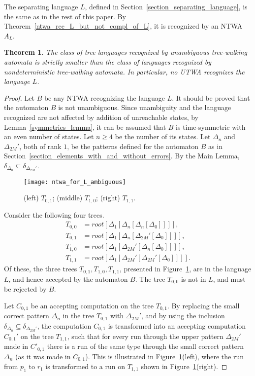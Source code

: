 \documentclass[12pt,a4paper]{article}
\newtheorem{theorem}{Theorem}
\theoremstyle{definition}
\begin{document}
The separating language $L$, defined in Section~\ref{section_separating_language},
is the same as in the rest of this paper.
By Theorem~\ref{ntwa_rec_L_but_not_compl_of_L},
it is recognized by an NTWA $A_L$.

\begin{theorem}\label{theorem_utwa_strictly_weaker_than_ntwa}
The class of tree languages recognized by unambiguous tree-walking automata
is strictly smaller than the class of languages recognized by nondeterministic tree-walking automata.
In particular, no UTWA recognizes the language $L$.
\end{theorem}
\begin{proof}
Let $B$ be any NTWA recognizing the language $L$.
It should be proved that the automaton $B$ is not unambiguous.
Since unambiguity and the language recognized
are not affected by addition of unreachable states,
by Lemma~\ref{symmetries_lemma},
it can be assumed that $B$ is time-symmetric with an even number of states.
Let $n \geqslant 4$ be the number of its states.
Let $\Delta_n$ and $\Delta_{2M}'$, both of rank $1$,
be the patterns defined for the automaton $B$
as in Section~\ref{section_elements_with_and_without_errors}.
By the Main Lemma, $\delta_{\Delta_n} \subseteq \delta_{\Delta_{2M}'}$.

\begin{figure}[tp]
	\centerline{\texttt{[image: ntwa\_for\_L\_ambiguous]}}
	\caption{(left) $T_{0,1}$; (middle) $T_{1,0}$; (right) $T_{1,1}$.}
	\label{f:ntwa_for_L_ambiguous}
\end{figure}

Consider the following four trees.
\begin{align*} 
T_{0,0} &= \mathit{root}[\Delta_1[\Delta_n[\Delta_n[\Delta_0]]]],\\
T_{0,1} &= \mathit{root}[\Delta_1[\Delta_n[\Delta_{2M}'[\Delta_0]]]],\\
T_{1,0} &= \mathit{root}[\Delta_1[\Delta_{2M}'[\Delta_n[\Delta_0]]]],\\
T_{1,1} &= \mathit{root}[\Delta_1[\Delta_{2M}'[\Delta_{2M}'[\Delta_0]]]].
\end{align*}
Of these, the three trees $T_{0,1}, T_{1,0}, T_{1,1}$,
presented in Figure~\ref{f:ntwa_for_L_ambiguous},
are in the language $L$, and hence accepted by the automaton $B$.
The tree $T_{0,0}$ is not in $L$, and must be rejected by $B$.

Let $C_{0,1}$ be an accepting computation on the tree $T_{0,1}$.
By replacing the small correct pattern $\Delta_n$ in the tree $T_{0,1}$
with $\Delta_{2M}'$, and by using the inclusion $\delta_{\Delta_n} \subseteq \delta_{\Delta_{2M}'}$,
the computation $C_{0,1}$ is transformed into an accepting computation $C_{0,1}'$ 
on the tree $T_{1,1}$,
such that for every run through the upper pattern $\Delta_{2M}'$ made in $C'_{0,1}$
there is a run of the same type through the small correct pattern $\Delta_n$ (as it was made in $C_{0,1}$).
This is illustrated in Figure~\ref{f:ntwa_for_L_ambiguous}(left),
where the run from $p_1$ to $r_1$
is transformed to a run on $T_{1,1}$
shown in Figure~\ref{f:ntwa_for_L_ambiguous}(right).


\end{proof}
\end{document}
